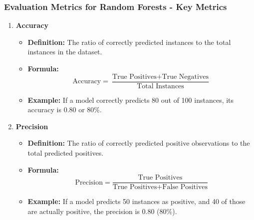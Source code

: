 \documentclass[aspectratio=169]{beamer}
\begin{document}
\begin{frame}
    \frametitle{Evaluation Metrics for Random Forests - Key Metrics}
    \begin{enumerate}
        \item \textbf{Accuracy}
        \begin{itemize}
            \item \textbf{Definition:} The ratio of correctly predicted instances to the total instances in the dataset.
            \item \textbf{Formula:}  
            \begin{equation}
                \text{Accuracy} = \frac{\text{True Positives} + \text{True Negatives}}{\text{Total Instances}}
            \end{equation}
            \item \textbf{Example:} If a model correctly predicts 80 out of 100 instances, its accuracy is 0.80 or 80\%.
        \end{itemize}
        
        \item \textbf{Precision}
        \begin{itemize}
            \item \textbf{Definition:} The ratio of correctly predicted positive observations to the total predicted positives.
            \item \textbf{Formula:}
            \begin{equation}
                \text{Precision} = \frac{\text{True Positives}}{\text{True Positives} + \text{False Positives}}
            \end{equation}
            \item \textbf{Example:} If a model predicts 50 instances as positive, and 40 of those are actually positive, the precision is 0.80 (80\%).
        \end{itemize}
    \end{enumerate}
\end{frame}
\end{document}
